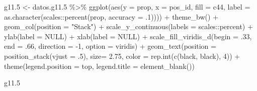 \documentclass[
  12pt,
]{book}
\newenvironment{Shaded}{\begin{snugshade}}{\end{snugshade}}
\newcommand{\AttributeTok}[1]{\textcolor[rgb]{0.77,0.63,0.00}{#1}}
\newcommand{\ConstantTok}[1]{\textcolor[rgb]{0.00,0.00,0.00}{#1}}
\newcommand{\DecValTok}[1]{\textcolor[rgb]{0.00,0.00,0.81}{#1}}
\newcommand{\FloatTok}[1]{\textcolor[rgb]{0.00,0.00,0.81}{#1}}
\newcommand{\FunctionTok}[1]{\textcolor[rgb]{0.00,0.00,0.00}{#1}}
\newcommand{\NormalTok}[1]{#1}
\newcommand{\OtherTok}[1]{\textcolor[rgb]{0.56,0.35,0.01}{#1}}
\newcommand{\SpecialCharTok}[1]{\textcolor[rgb]{0.00,0.00,0.00}{#1}}
\newcommand{\StringTok}[1]{\textcolor[rgb]{0.31,0.60,0.02}{#1}}
\begin{document}
\begin{Shaded}
\begin{Highlighting}[]
\NormalTok{g11}\FloatTok{.5} \OtherTok{\textless{}{-}}\NormalTok{ datos.g11}\FloatTok{.5} \SpecialCharTok{\%\textgreater{}\%} 
  \FunctionTok{ggplot}\NormalTok{(}\FunctionTok{aes}\NormalTok{(}\AttributeTok{y =}\NormalTok{ prop, }\AttributeTok{x =}\NormalTok{ pos\_id, }\AttributeTok{fill =}\NormalTok{ c44, }
             \AttributeTok{label =} \FunctionTok{as.character}\NormalTok{(scales}\SpecialCharTok{::}\FunctionTok{percent}\NormalTok{(prop, }\AttributeTok{accuracy =}\NormalTok{ .}\DecValTok{1}\NormalTok{)))) }\SpecialCharTok{+} 
  \FunctionTok{theme\_bw}\NormalTok{() }\SpecialCharTok{+} 
  \FunctionTok{geom\_col}\NormalTok{(}\AttributeTok{position =} \StringTok{"Stack"}\NormalTok{) }\SpecialCharTok{+}
  \FunctionTok{scale\_y\_continuous}\NormalTok{(}\AttributeTok{labels =}\NormalTok{ scales}\SpecialCharTok{::}\NormalTok{percent) }\SpecialCharTok{+}
  \FunctionTok{ylab}\NormalTok{(}\AttributeTok{label =} \ConstantTok{NULL}\NormalTok{) }\SpecialCharTok{+}
  \FunctionTok{xlab}\NormalTok{(}\AttributeTok{label =} \ConstantTok{NULL}\NormalTok{) }\SpecialCharTok{+}
  \FunctionTok{scale\_fill\_viridis\_d}\NormalTok{(}\AttributeTok{begin =}\NormalTok{ .}\DecValTok{33}\NormalTok{, }\AttributeTok{end =}\NormalTok{ .}\DecValTok{66}\NormalTok{, }\AttributeTok{direction =} \SpecialCharTok{{-}}\DecValTok{1}\NormalTok{, }\AttributeTok{option =} \StringTok{\textquotesingle{}viridis\textquotesingle{}}\NormalTok{) }\SpecialCharTok{+}
  \FunctionTok{geom\_text}\NormalTok{(}\AttributeTok{position =} \FunctionTok{position\_stack}\NormalTok{(}\AttributeTok{vjust =}\NormalTok{ .}\DecValTok{5}\NormalTok{),}
            \AttributeTok{size=} \FloatTok{2.75}\NormalTok{, }\AttributeTok{color =} \FunctionTok{rep.int}\NormalTok{(}\FunctionTok{c}\NormalTok{(}\StringTok{\textquotesingle{}black\textquotesingle{}}\NormalTok{, }\StringTok{\textquotesingle{}black\textquotesingle{}}\NormalTok{), }\DecValTok{4}\NormalTok{)) }\SpecialCharTok{+} 
  \FunctionTok{theme}\NormalTok{(}\AttributeTok{legend.position =} \StringTok{\textquotesingle{}top\textquotesingle{}}\NormalTok{,}
        \AttributeTok{legend.title =} \FunctionTok{element\_blank}\NormalTok{())}

\NormalTok{g11}\FloatTok{.5}
\end{Highlighting}
\end{Shaded}
\end{document}
